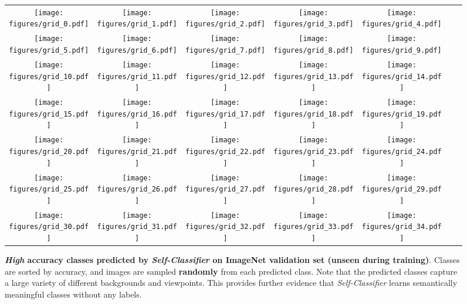 \documentclass[runningheads]{llncs}
\begin{document}
\begin{figure}[H]
\small
\centering
\begin{tabular}{ccccccc}
    \texttt{[image: figures/grid\_0.pdf]} & \texttt{[image: figures/grid\_1.pdf]} & \texttt{[image: figures/grid\_2.pdf]} & \texttt{[image: figures/grid\_3.pdf]} & \texttt{[image: figures/grid\_4.pdf]} \\
  \texttt{[image: figures/grid\_5.pdf]} & \texttt{[image: figures/grid\_6.pdf]} & \texttt{[image: figures/grid\_7.pdf]} & \texttt{[image: figures/grid\_8.pdf]} & \texttt{[image: figures/grid\_9.pdf]} \\ \texttt{[image: figures/grid\_10.pdf]} & \texttt{[image: figures/grid\_11.pdf]} & \texttt{[image: figures/grid\_12.pdf]} & \texttt{[image: figures/grid\_13.pdf]} & \texttt{[image: figures/grid\_14.pdf]} \\
  \texttt{[image: figures/grid\_15.pdf]} & \texttt{[image: figures/grid\_16.pdf]} & \texttt{[image: figures/grid\_17.pdf]} & \texttt{[image: figures/grid\_18.pdf]} & \texttt{[image: figures/grid\_19.pdf]} \\
  \texttt{[image: figures/grid\_20.pdf]} & \texttt{[image: figures/grid\_21.pdf]} & \texttt{[image: figures/grid\_22.pdf]} & \texttt{[image: figures/grid\_23.pdf]} & \texttt{[image: figures/grid\_24.pdf]} \\
  \texttt{[image: figures/grid\_25.pdf]} & \texttt{[image: figures/grid\_26.pdf]} & \texttt{[image: figures/grid\_27.pdf]} & \texttt{[image: figures/grid\_28.pdf]} & \texttt{[image: figures/grid\_29.pdf]} \\
  \texttt{[image: figures/grid\_30.pdf]} & \texttt{[image: figures/grid\_31.pdf]} & \texttt{[image: figures/grid\_32.pdf]} & \texttt{[image: figures/grid\_33.pdf]} & \texttt{[image: figures/grid\_34.pdf]} 
\end{tabular}
\caption{\textbf{\textit{High} accuracy classes predicted by \textit{Self-Classifier} on ImageNet validation set (unseen during training)}. Classes are sorted by accuracy, and images are sampled \textbf{randomly} from each predicted class. Note that the predicted classes capture a large variety of different backgrounds and viewpoints. This provides further evidence that \textit{Self-Classifier} learns semantically meaningful classes without any labels.}
\label{fig:all_classes}
\end{figure}
\end{document}
